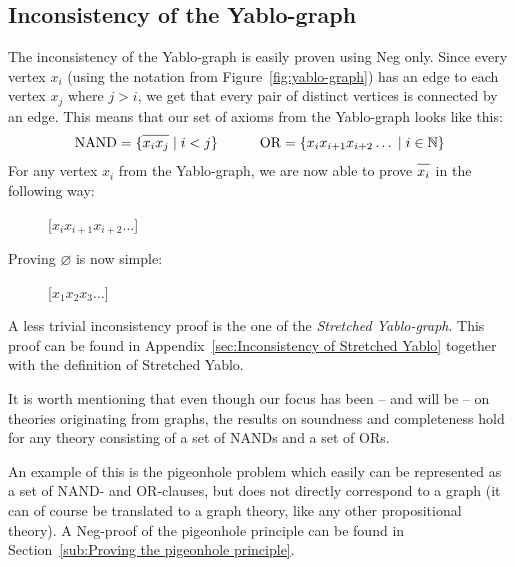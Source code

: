\subsection{Inconsistency of the Yablo-graph}
\label{sub:Inconsistency of the Yablo-graph}
The inconsistency of the Yablo-graph is easily proven using Neg only.
Since every vertex $x_i$ (using the notation from Figure~\ref{fig:yablo-graph}) has an edge to each vertex $x_j$ where $j > i$, we get that every pair of distinct vertices is connected by an edge.
This means that our set of axioms from the Yablo-graph looks like this:
\begin{align}
  \text{NAND} = \{ \ol{x_ix_j} \; |\; i < j\}
  \quad\quad\quad
  \text{OR} = \{ x_ix_{i+1}x_{i+2}\dots \; |\; i \in \mathbb{N}\}
\end{align}
For any vertex $x_i$ from the Yablo-graph, we are now able to prove $\ol{x_i}$ in the following way:\par
\begin{figure}[!h]
  \centering
  \begin{prooftree*}
    \Hypo{\dots}
    [$x_ix_{i+1}x_{i+2}\dots$]{}
  \end{prooftree*}
  \caption{}
  \label{fig:proof_xi}
\end{figure}
\FloatBarrier
Proving $\varnothing$ is now simple:\par
\begin{figure}[!h]
  \centering
  \begin{prooftree*}
    \Hypo{\dots}
    \Hypo{\dots}
    \Hypo{\dots}
    \Hypo{\dots}
    [$x_1x_2x_3\dots$]{\varnothing}
  \end{prooftree*}
  \caption{}
  \label{fig:proof_yablo}
\end{figure}
\FloatBarrier
A less trivial inconsistency proof is the one of the \textit{Stretched Yablo-graph}.
This proof can be found in Appendix~\ref{sec:Inconsistency of Stretched Yablo} together with the definition of Stretched Yablo.

It is worth mentioning that even though our focus has been -- and will be -- on theories originating from graphs, the results on soundness and completeness hold for any theory consisting of a set of NANDs and a set of ORs.

An example of this is the pigeonhole problem which easily can be represented as a set of NAND- and OR-clauses, but does not directly correspond to a graph (it can of course be translated to a graph theory, like any other propositional theory).
A Neg-proof of the pigeonhole principle can be found in Section~\ref{sub:Proving the pigeonhole principle}.
